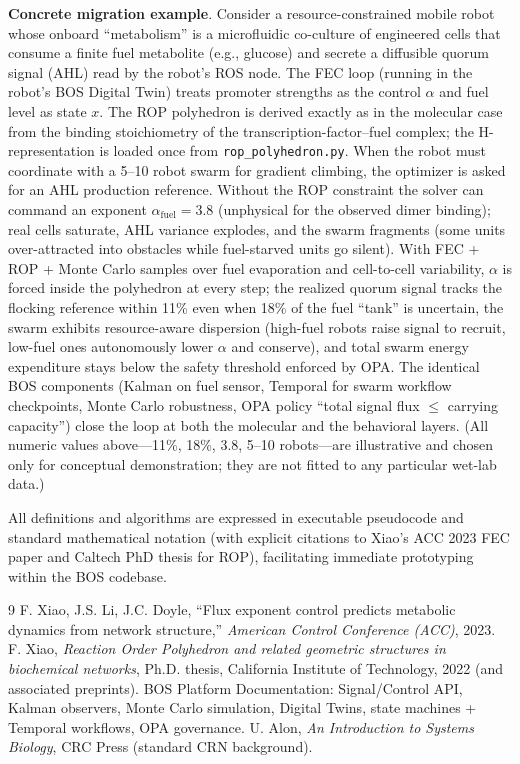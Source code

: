 \documentclass[11pt,a4paper]{article}
\begin{document}
\textbf{Concrete migration example}. Consider a resource-constrained mobile robot whose onboard ``metabolism'' is a microfluidic co-culture of engineered cells that consume a finite fuel metabolite (e.g., glucose) and secrete a diffusible quorum signal (AHL) read by the robot's ROS node. The FEC loop (running in the robot's BOS Digital Twin) treats promoter strengths as the control \(\alpha\) and fuel level as state \(x\). The ROP polyhedron is derived exactly as in the molecular case from the binding stoichiometry of the transcription-factor--fuel complex; the H-representation is loaded once from \texttt{rop\_polyhedron.py}. When the robot must coordinate with a 5--10 robot swarm for gradient climbing, the optimizer is asked for an AHL production reference. Without the ROP constraint the solver can command an exponent \(\alpha_{\text{fuel}} = 3.8\) (unphysical for the observed dimer binding); real cells saturate, AHL variance explodes, and the swarm fragments (some units over-attracted into obstacles while fuel-starved units go silent). With FEC + ROP + Monte Carlo samples over fuel evaporation and cell-to-cell variability, \(\alpha\) is forced inside the polyhedron at every step; the realized quorum signal tracks the flocking reference within 11\% even when 18\% of the fuel ``tank'' is uncertain, the swarm exhibits resource-aware dispersion (high-fuel robots raise signal to recruit, low-fuel ones autonomously lower \(\alpha\) and conserve), and total swarm energy expenditure stays below the safety threshold enforced by OPA. The identical BOS components (Kalman on fuel sensor, Temporal for swarm workflow checkpoints, Monte Carlo robustness, OPA policy ``total signal flux \(\leq\) carrying capacity'') close the loop at both the molecular and the behavioral layers. (All numeric values above---11\%, 18\%, 3.8, 5--10 robots---are illustrative and chosen only for conceptual demonstration; they are not fitted to any particular wet-lab data.)

All definitions and algorithms are expressed in executable pseudocode and standard mathematical notation (with explicit citations to Xiao's ACC 2023 FEC paper and Caltech PhD thesis for ROP), facilitating immediate prototyping within the BOS codebase.


\begin{thebibliography}{9}
 F. Xiao, J.S. Li, J.C. Doyle, ``Flux exponent control predicts metabolic dynamics from network structure,'' \textit{American Control Conference (ACC)}, 2023.
 F. Xiao, \textit{Reaction Order Polyhedron and related geometric structures in biochemical networks}, Ph.D. thesis, California Institute of Technology, 2022 (and associated preprints).
 BOS Platform Documentation: Signal/Control API, Kalman observers, Monte Carlo simulation, Digital Twins, state machines + Temporal workflows, OPA governance.
 U. Alon, \textit{An Introduction to Systems Biology}, CRC Press (standard CRN background).
\end{thebibliography}
\end{document}
